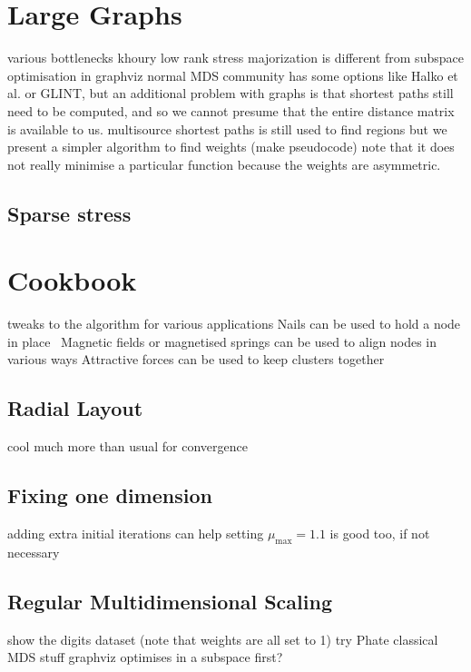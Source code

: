 \section{Large Graphs}
\label{sec:large_graphs}
various bottlenecks
khoury low rank stress majorization is different from subspace optimisation in graphviz
normal MDS community has some options like Halko et al. or GLINT, but an additional problem with graphs is that shortest paths still need to be computed, and so we cannot presume that the entire distance matrix is available to us.
multisource shortest paths is still used to find regions
but we present a simpler algorithm to find weights (make pseudocode)
note that it does not really minimise a particular function because the weights are asymmetric.

\subsection{Sparse stress}

\section{Cookbook}
tweaks to the algorithm for various applications
Nails can be used to hold a node in place~\cite{something}
Magnetic fields or magnetised springs can be used to align nodes in various ways
Attractive forces can be used to keep clusters together
\subsection{Radial Layout}
cool much more than usual for convergence
\subsection{Fixing one dimension}
adding extra initial iterations can help
setting $\mu_{\max}=1.1$ is good too, if not necessary
\subsection{Regular Multidimensional Scaling}
show the digits dataset (note that weights are all set to 1)
try Phate classical MDS stuff
graphviz optimises in a subspace first?